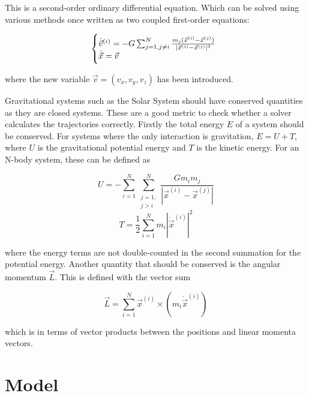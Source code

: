 \documentclass{physics_article_B}
\begin{document}
This is a second-order ordinary differential equation. Which can be solved using various methods once written as two coupled first-order equations:

\begin{equation}
 \label{eq:vectorcoupled}
\left\{
 \begin{array}{@{}ll@{}}
 \dot{\vec{v}}^{(i)} = -G\sum_{j=1, j\neq i}^N\frac{m_j(\vec{x}^{(i)} - \vec{x}^{(j)})}{|\vec{x}^{(i)} - \vec{x}^{(j)}|^3}\\
 \dot{\vec{x}} = \vec{v}\\
 \end{array}\right.
\end{equation}

where the new variable $\vec{v} = (v_x, v_y, v_z)$ has been introduced.

Gravitational systems such as the Solar System should have conserved quantities as they are closed systems. These are a good metric to check whether a solver calculates the trajectories correctly. Firstly the total energy $E$ of a system should be conserved. For systems where the only interaction is gravitation, $E = U + T$, where $U$ is the gravitational potential energy and $T$ is the kinetic energy. For an N-body system, these can be defined as

\begin{equation}
 U = -\sum_{i=1}^N\sum_{\substack{j=1,\\ j > i}}^N\frac{Gm_im_j}{|\vec{x}^{(i)} - \vec{x}^{(j)}|}
 \label{eq:gravpotential}
\end{equation}
\begin{equation}
 T = \frac{1}{2}\sum_{i=1}^Nm_i|\dot{\vec{x}}^{(i)}|^2
 \label{eq:kinetic}
\end{equation}

where the energy terms are not double-counted in the second summation for the potential energy. Another quantity that should be conserved is the angular momentum $\vec{L}$. This is defined with the vector sum

\begin{equation}
 \vec{L} = \sum_{i=1}^N\vec{x}^{(i)}\times(m_i\dot{\vec{x}}^{(i)})
 \label{eq:angmom}
\end{equation}

which is in terms of vector products between the positions and linear momenta vectors.

\section{Model}
\end{document}
